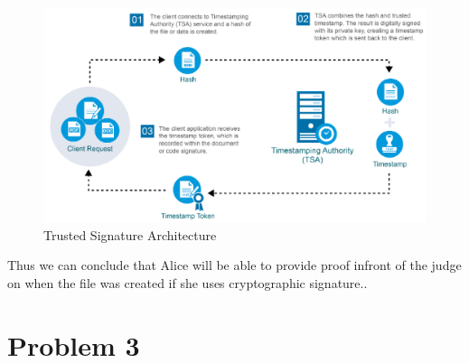 \documentclass{article}
\begin{document}
\begin{enumerate}[label=\alph*]
\begin{figure}[h!]
\centering
\includegraphics[scale=0.5]{TSA1.png}
\caption{Trusted Signature Architecture}
\label{fig:aesni_output_in_c}
\end{figure}

Thus we can conclude that Alice will be able to provide proof infront of the judge on when the file was created if she uses cryptographic signature..


\end{enumerate}



\section{Problem 3}
\end{document}
